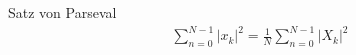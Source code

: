 Satz von Parseval
\begin{align}
\sum\limits_{n=0}^{N-1} |x_k|^2 = \frac{1}{N}\sum\limits_{n=0}^{N-1} |X_k|^2 
\end{align}